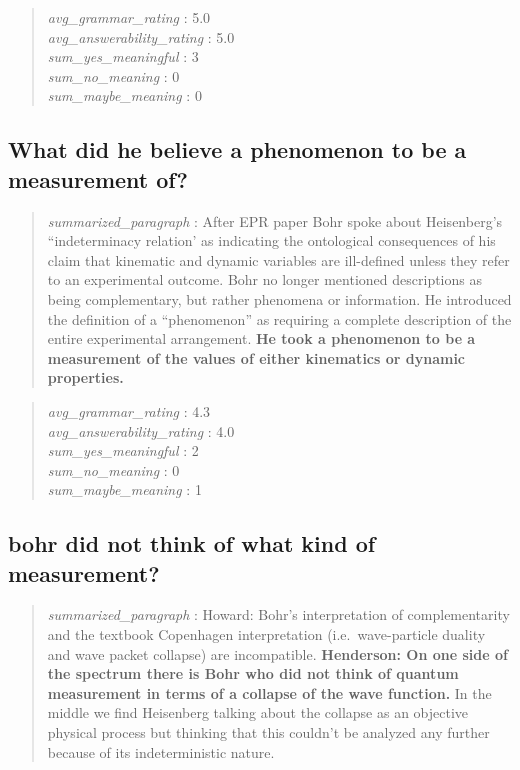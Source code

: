 \begin{quote}
\emph{avg\_grammar\_rating} : 5.0\\
\emph{avg\_answerability\_rating} : 5.0\\
\emph{sum\_yes\_meaningful} : 3\\
\emph{sum\_no\_meaning} : 0\\
\emph{sum\_maybe\_meaning} : 0
\end{quote}

\hypertarget{what-did-he-believe-a-phenomenon-to-be-a-measurement-of}{%
\subsection{What did he believe a phenomenon to be a measurement
of?}\label{what-did-he-believe-a-phenomenon-to-be-a-measurement-of}}

\begin{quote}
\emph{summarized\_paragraph} : After EPR paper Bohr spoke about
Heisenberg's ``indeterminacy relation' as indicating the ontological
consequences of his claim that kinematic and dynamic variables are
ill-defined unless they refer to an experimental outcome. Bohr no longer
mentioned descriptions as being complementary, but rather phenomena or
information. He introduced the definition of a ``phenomenon'' as
requiring a complete description of the entire experimental arrangement.
\textbf{He took a phenomenon to be a measurement of the values of either
kinematics or dynamic properties.}
\end{quote}

\begin{quote}
\emph{avg\_grammar\_rating} : 4.3\\
\emph{avg\_answerability\_rating} : 4.0\\
\emph{sum\_yes\_meaningful} : 2\\
\emph{sum\_no\_meaning} : 0\\
\emph{sum\_maybe\_meaning} : 1
\end{quote}

\hypertarget{bohr-did-not-think-of-what-kind-of-measurement}{%
\subsection{bohr did not think of what kind of
measurement?}\label{bohr-did-not-think-of-what-kind-of-measurement}}

\begin{quote}
\emph{summarized\_paragraph} : Howard: Bohr's interpretation of
complementarity and the textbook Copenhagen interpretation
(i.e.~wave-particle duality and wave packet collapse) are incompatible.
\textbf{Henderson: On one side of the spectrum there is Bohr who did not
think of quantum measurement in terms of a collapse of the wave
function.} In the middle we find Heisenberg talking about the collapse
as an objective physical process but thinking that this couldn't be
analyzed any further because of its indeterministic nature.
\end{quote}

